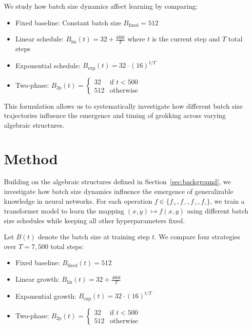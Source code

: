 \documentclass{article} %
\begin{document}
We study how batch size dynamics affect learning by comparing:
\begin{itemize}
    \item Fixed baseline: Constant batch size $B_{\text{fixed}} = 512$
    \item Linear schedule: $B_{\text{lin}}(t) = 32 + \frac{480t}{T}$ where $t$ is the current step and $T$ total steps
    \item Exponential schedule: $B_{\text{exp}}(t) = 32 \cdot (16)^{t/T}$
    \item Two-phase: $B_{\text{2p}}(t) = \begin{cases} 32 & \text{if } t < 500 \\ 512 & \text{otherwise} \end{cases}$
\end{itemize}

This formulation allows us to systematically investigate how different batch size trajectories influence the emergence and timing of grokking across varying algebraic structures.

\section{Method}
\label{sec:method}

Building on the algebraic structures defined in Section~\ref{sec:background}, we investigate how batch size dynamics influence the emergence of generalizable knowledge in neural networks. For each operation $f \in \{f_+, f_-, f_{\div}, f_{\circ}\}$, we train a transformer model to learn the mapping $(x,y) \mapsto f(x,y)$ using different batch size schedules while keeping all other hyperparameters fixed.

Let $B(t)$ denote the batch size at training step $t$. We compare four strategies over $T=7{,}500$ total steps:

\begin{itemize}
    \item Fixed baseline: $B_{\text{fixed}}(t) = 512$
    \item Linear growth: $B_{\text{lin}}(t) = 32 + \frac{480t}{T}$
    \item Exponential growth: $B_{\text{exp}}(t) = 32 \cdot (16)^{t/T}$
    \item Two-phase: $B_{\text{2p}}(t) = \begin{cases} 32 & \text{if } t < 500 \\ 512 & \text{otherwise} \end{cases}$
\end{itemize}
\end{document}
